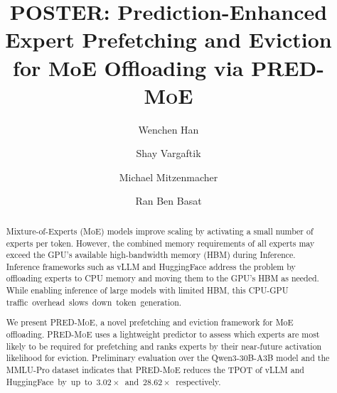 \documentclass[sigconf]{acmart}
\newcommand{\sysname}{\textsc{PRED-MoE}\xspace}
\newcommand{\sys}{\sysname}
\begin{document}
\title[POSTER: \sysname]{POSTER: Prediction-Enhanced Expert Prefetching and Eviction for MoE Offloading via \sysname}



\author{Wenchen Han}

\author{Shay Vargaftik} 

\author{Michael Mitzenmacher}




\author{Ran Ben Basat}

\renewcommand{\shortauthors}{W. Han, S. Vargaftik, M. Mitzenmacher, R. Ben Basat}

\begin{abstract}
Mixture-of-Experts (MoE) models improve scaling by activating a small number of experts per token. 
However, the combined memory requirements of all experts may exceed the GPU's available high-bandwidth memory (HBM) during Inference. 
Inference frameworks such as vLLM and HuggingFace address the problem by offloading experts to CPU memory and moving them to the GPU's HBM as needed. While enabling inference of large models with limited HBM, this CPU-GPU \mbox{traffic overhead slows down token generation.} 

We present \sys, a novel prefetching and eviction framework for MoE offloading. 
\sys uses a lightweight predictor to assess which experts are most likely to be required for prefetching and ranks experts by their near-future activation likelihood for eviction. Preliminary evaluation over the Qwen3-30B-A3B model and the MMLU-Pro dataset indicates that \sys reduces the TPOT of vLLM and \mbox{HuggingFace by up to $3.02\times$ and $28.62\times$~respectively.}
\end{abstract}

\maketitle
\vspace{-0.02468106in}
\end{document}
